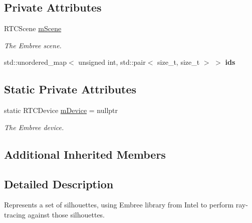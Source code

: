 \subsection*{Private Attributes}
\begin{DoxyCompactItemize}
\item 
\mbox{\label{classvisilib_1_1_silhouette_container_embree_af4054861fb6b0bea527689b4cec1d59a}} 
R\+T\+C\+Scene \mbox{\hyperlink{classvisilib_1_1_silhouette_container_embree_af4054861fb6b0bea527689b4cec1d59a}{m\+Scene}}
\begin{DoxyCompactList}\small\item\em The Embree scene. \end{DoxyCompactList}\item 
\mbox{\label{classvisilib_1_1_silhouette_container_embree_a79d334ebeeb331eb3268a0da8cdd006d}} 
std\+::unordered\+\_\+map$<$ unsigned int, std\+::pair$<$ size\+\_\+t, size\+\_\+t $>$ $>$ {\bfseries ids}
\end{DoxyCompactItemize}
\subsection*{Static Private Attributes}
\begin{DoxyCompactItemize}
\item 
\mbox{\label{classvisilib_1_1_silhouette_container_embree_a5be6b858528a5207948fe5bdb9a72072}} 
static R\+T\+C\+Device \mbox{\hyperlink{classvisilib_1_1_silhouette_container_embree_a5be6b858528a5207948fe5bdb9a72072}{m\+Device}} = nullptr
\begin{DoxyCompactList}\small\item\em The Embree device. \end{DoxyCompactList}\end{DoxyCompactItemize}
\subsection*{Additional Inherited Members}


\subsection{Detailed Description}
Represents a set of silhouettes, using Embree library from Intel to perform ray-\/tracing against those silhouettes. 


